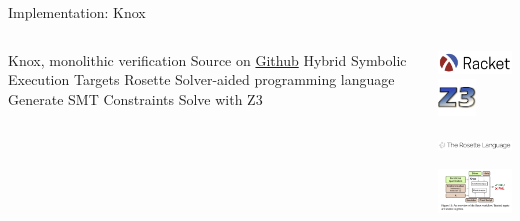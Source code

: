 \begin{frame}{Implementation: Knox}
\begin{columns}
  \centering
  \begin{outline}
  \1 Knox, monolithic verification
  \2 Source on \href{https://github.com/anishathalye/knox}{Github}
  \2 Hybrid Symbolic Execution \cite{Torlak2014lightweight}
  \1 Targets Rosette \cite{Torlak2013Growing}
  \2 Solver-aided programming language
  \1 Generate SMT Constraints
  \2 Solve with Z3 \cite{De2008Z3}
  \end{outline}

  \centering
  \begin{center}
  \includegraphics[width=3cm]{racket_logo.png}
  \includegraphics[width=1cm]{z3_logo.jpg}

  \vspace{0.5cm}

  \includegraphics[width=5cm]{rosette_logo.png}

  \vspace{0.5cm}

  \includegraphics[width=5cm]{fig_11.png}

  \end{center}
\end{columns}
\end{frame}

